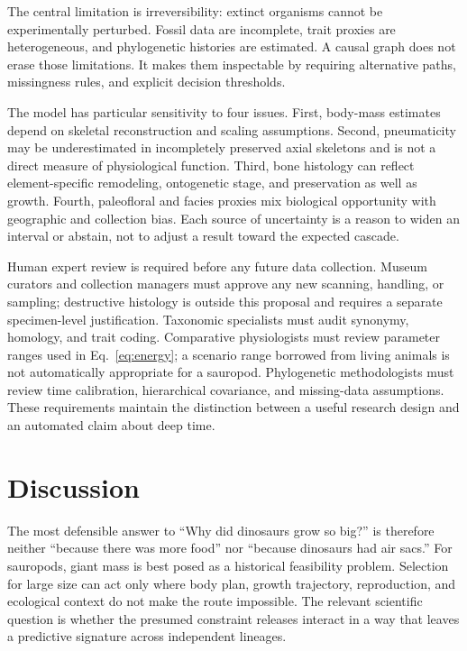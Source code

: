 \documentclass[conference]{IEEEtran}
\begin{document}
The central limitation is irreversibility: extinct organisms cannot be experimentally perturbed. Fossil data are incomplete, trait proxies are heterogeneous, and phylogenetic histories are estimated. A causal graph does not erase those limitations. It makes them inspectable by requiring alternative paths, missingness rules, and explicit decision thresholds.

The model has particular sensitivity to four issues. First, body-mass estimates depend on skeletal reconstruction and scaling assumptions. Second, pneumaticity may be underestimated in incompletely preserved axial skeletons and is not a direct measure of physiological function. Third, bone histology can reflect element-specific remodeling, ontogenetic stage, and preservation as well as growth. Fourth, paleofloral and facies proxies mix biological opportunity with geographic and collection bias. Each source of uncertainty is a reason to widen an interval or abstain, not to adjust a result toward the expected cascade.

Human expert review is required before any future data collection. Museum curators and collection managers must approve any new scanning, handling, or sampling; destructive histology is outside this proposal and requires a separate specimen-level justification. Taxonomic specialists must audit synonymy, homology, and trait coding. Comparative physiologists must review parameter ranges used in Eq.~\eqref{eq:energy}; a scenario range borrowed from living animals is not automatically appropriate for a sauropod. Phylogenetic methodologists must review time calibration, hierarchical covariance, and missing-data assumptions. These requirements maintain the distinction between a useful research design and an automated claim about deep time.

\section{Discussion}

The most defensible answer to ``Why did dinosaurs grow so big?'' is therefore neither ``because there was more food'' nor ``because dinosaurs had air sacs.'' For sauropods, giant mass is best posed as a historical feasibility problem. Selection for large size can act only where body plan, growth trajectory, reproduction, and ecological context do not make the route impossible. The relevant scientific question is whether the presumed constraint releases interact in a way that leaves a predictive signature across independent lineages.
\end{document}
